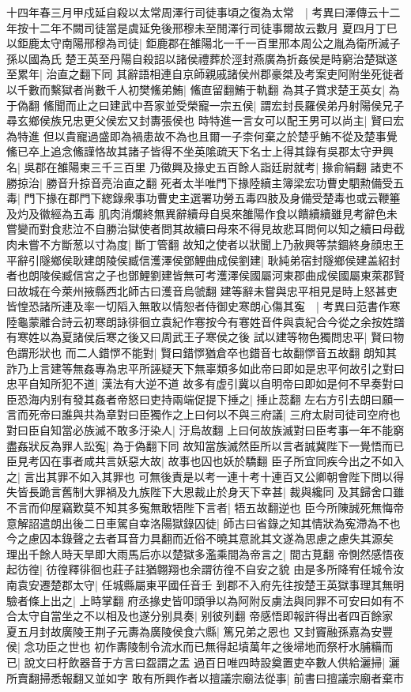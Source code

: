 十四年春三月甲戍延自殺以太常周澤行司徒事頃之復為太常　|{
	考異曰澤傳云十二年按十二年不闕司徒當是虞延免後邢穆未至閒澤行司徒事爾故云數月}
夏四月丁巳以鉅鹿太守南陽邢穆為司徒|{
	鉅鹿郡在雒陽北一千一百里邢本周公之胤為衛所滅子孫以國為氏}
楚王英至丹陽自殺詔以諸侯禮葬於涇封燕廣為折姦侯是時窮治楚獄遂至累年|{
	治直之翻下同}
其辭語相連自京師親戚諸侯州郡豪桀及考案吏阿附坐死徙者以千數而繫獄者尚數千人初樊鯈弟鮪|{
	鯈直留翻鮪于軌翻}
為其子賞求楚王英女|{
	為于偽翻}
鯈聞而止之曰建武中吾家並受榮寵一宗五侯|{
	謂宏封長羅侯弟丹射陽侯兄子尋玄鄉侯族兄忠更父侯宏又封夀張侯也}
時特進一言女可以配王男可以尚主|{
	賢曰宏為特進}
但以貴寵過盛即為禍患故不為也且爾一子柰何棄之於楚乎鮪不從及楚事覺鯈已卒上追念鯈謹恪故其諸子皆得不坐英隂疏天下名士上得其錄有吳郡太守尹興名|{
	吳郡在雒陽東三千三百里}
乃徵興及掾史五百餘人詣廷尉就考|{
	掾俞絹翻}
諸吏不勝掠治|{
	勝音升掠音亮治直之翻}
死者太半唯門下掾陸續主簿梁宏功曹史駟勲備受五毒|{
	門下掾在郡門下緫錄衆事功曹史主選署功勞五毒四肢及身備受楚毒也或云鞭箠及灼及徽經為五毒}
肌肉消爛終無異辭續母自吳來雒陽作食以饋續續雖見考辭色未嘗變而對食悲泣不自勝治獄使者問其故續曰母來不得見故悲耳問何以知之續曰母截肉未嘗不方斷葱以寸為度|{
	斷丁管翻}
故知之使者以狀聞上乃赦興等禁錮終身顔忠王平辭引隧鄉侯耿建朗陵侯臧信濩澤侯鄧鯉曲成侯劉建|{
	耿純弟宿封隧鄉侯建盖紹封者也朗陵侯臧信宮之子也鄧鯉劉建皆無可考濩澤侯國屬河東郡曲成侯國屬東萊郡賢曰故城在今萊州掖縣西北師古曰濩音烏虢翻}
建等辭未嘗與忠平相見是時上怒甚吏皆惶恐諸所連及率一切䧟入無敢以情恕者侍御史寒朗心傷其寃　|{
	考異曰范書作寒陸龜蒙離合詩云初寒朗詠徘徊立袁紀作寋按今有寋姓音件與袁紀合今從之余按姓譜有寒姓以為夏諸侯后寒之後又曰周武王子寒侯之後}
試以建等物色獨問忠平|{
	賢曰物色謂形狀也}
而二人錯㦍不能對|{
	賢曰錯㦍猶倉卒也錯音七故翻㦍音五故翻}
朗知其詐乃上言建等無姦專為忠平所誣疑天下無辜類多如此帝曰即如是忠平何故引之對曰忠平自知所犯不道|{
	漢法有大逆不道}
故多有虚引冀以自明帝曰即如是何不早奏對曰臣恐海内别有發其姦者帝怒曰吏持兩端促提下捶之|{
	捶止蕊翻}
左右方引去朗曰願一言而死帝曰誰與共為章對曰臣獨作之上曰何以不與三府議|{
	三府太尉司徒司空府也}
對曰臣自知當必族滅不敢多汙染人|{
	汙烏故翻}
上曰何故族滅對曰臣考事一年不能窮盡姦狀反為罪人訟寃|{
	為于偽翻下同}
故知當族滅然臣所以言者誠冀陛下一覺悟而已臣見考囚在事者咸共言妖惡大故|{
	故事也囚也妖於驕翻}
臣子所宜同疾今出之不如入之|{
	言出其罪不如入其罪也}
可無後責是以考一連十考十連百又公卿朝會陛下問以得失皆長跪言舊制大罪禍及九族陛下大恩裁止於身天下幸甚|{
	裁與纔同}
及其歸舍口雖不言而仰屋竊歎莫不知其多寃無敢牾陛下言者|{
	牾五故翻逆也}
臣今所陳誠死無悔帝意解詔遣朗出後二日車駕自幸洛陽獄錄囚徒|{
	師古曰省錄之知其情狀為寃滯為不也今之慮囚本錄聲之去者耳音力具翻而近俗不曉其意訛其文遂為思慮之慮失其源矣}
理出千餘人時天旱即大雨馬后亦以楚獄多濫乘間為帝言之|{
	間古莧翻}
帝惻然感悟夜起彷徨|{
	彷徨釋徘徊也莊子註猶翺翔也余謂彷徨不自安之貌}
由是多所降宥任城令汝南袁安遷楚郡太守|{
	任城縣屬東平國任音壬}
到郡不入府先往按楚王英獄事理其無明驗者條上出之|{
	上時掌翻}
府丞掾史皆叩頭爭以為阿附反虜法與同罪不可安曰如有不合太守自當坐之不以相及也遂分别具奏|{
	别彼列翻}
帝感悟即報許得出者四百餘家　夏五月封故廣陵王荆子元夀為廣陵侯食六縣|{
	篤兄弟之恩也}
又封竇融孫嘉為安豐侯|{
	念功臣之世也}
初作夀陵制令流水而已無得起墳萬年之後埽地而祭杅水脯糒而已|{
	說文曰杅飲器音于方言曰盌謂之盂}
過百日唯四時設奠置吏卒數人供給灑掃|{
	灑所賣翻掃悉報翻又並如字}
敢有所興作者以擅議宗廟法從事|{
	前書曰擅議宗廟者棄市}


